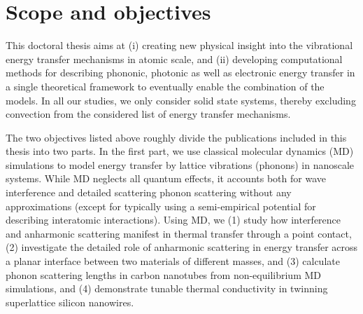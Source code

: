 


\section{Scope and objectives}

This doctoral thesis aims at (i) creating new physical insight into the vibrational energy transfer mechanisms in atomic scale, and (ii) developing computational methods for describing phononic, photonic as well as electronic energy transfer in a single theoretical framework to eventually enable the combination of the models. In all our studies, we only consider solid state systems, thereby excluding convection from the considered list of energy transfer mechanisms. %

The two objectives listed above roughly divide the publications included in this thesis into two parts. In the first part, we use classical molecular dynamics (MD) simulations to model energy transfer by lattice vibrations (phonons) in nanoscale systems. While MD neglects all quantum effects, it accounts both for wave interference and detailed scattering phonon scattering without any approximations (except for typically using a semi-empirical potential for describing interatomic interactions). Using MD, we (1) study how interference and anharmonic scattering manifest in thermal transfer through a point contact, (2) investigate the detailed role of anharmonic scattering in energy transfer across a planar interface between two materials of different masses, and (3) calculate phonon scattering lengths in carbon nanotubes from non-equilibrium MD simulations, and (4) demonstrate tunable thermal conductivity in twinning superlattice silicon nanowires.

